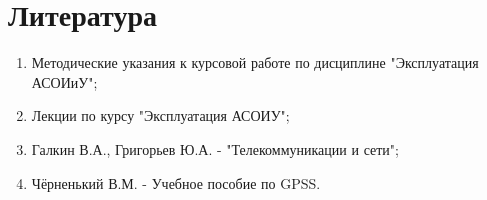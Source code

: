 \newpage

\section{Литература}

\begin{enumerate}
\item Методические  указания к курсовой работе по дисциплине "Эксплуатация АСОИиУ";
\item Лекции по курсу "Эксплуатация АСОИУ";
\item Галкин В.А., Григорьев Ю.А. - "Телекоммуникации и сети";
\item Чёрненький В.М. - Учебное пособие по GPSS.
\end{enumerate}